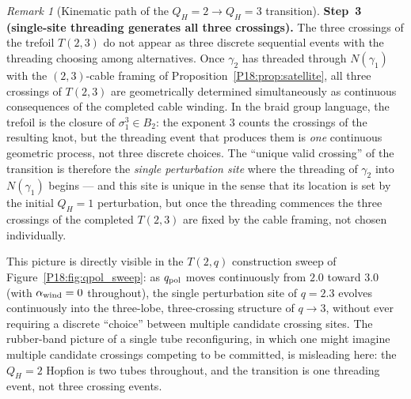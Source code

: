 \documentclass[11pt,a4paper]{article}
\theoremstyle{definition}\newtheorem{definition}[theorem]{Definition}
\theoremstyle{remark}
\newtheorem{remark}[theorem]{Remark}
\newcommand{\QH}{Q_H}
\begin{document}
\begin{remark}[Kinematic path of the $\QH=2\to\QH=3$ transition]
\textbf{Step~3 (single-site threading generates all three crossings).}
The three crossings of the trefoil $T(2,3)$ do not appear as three
discrete sequential events with the threading choosing among
alternatives.  Once $\gamma_2$ has threaded through $N(\gamma_1)$
with the $(2,3)$-cable framing of Proposition~\ref{P18:prop:satellite},
all three crossings of $T(2,3)$ are geometrically determined
simultaneously as continuous consequences of the completed cable
winding.  In the braid group language, the trefoil is the closure
of $\sigma_1^3\in B_2$: the exponent $3$ counts the crossings of the
resulting knot, but the threading event that produces them is
\emph{one} continuous geometric process, not three discrete choices.
The ``unique valid crossing'' of the transition is therefore the
\emph{single perturbation site} where the threading of $\gamma_2$
into $N(\gamma_1)$ begins --- and this site is unique in the sense
that its location is set by the initial $\QH=1$ perturbation, but
once the threading commences the three crossings of the completed
$T(2,3)$ are fixed by the cable framing, not chosen individually.

This picture is directly visible in the $T(2,q)$ construction sweep
of Figure~\ref{P18:fig:qpol_sweep}: as $q_{\rm pol}$ moves continuously
from $2.0$ toward $3.0$ (with $\alpha_{\rm wind}=0$ throughout), the
single perturbation site of $q=2.3$ evolves continuously into the
three-lobe, three-crossing structure of $q\to3$, without ever
requiring a discrete ``choice'' between multiple candidate crossing
sites.  The rubber-band picture of a single tube reconfiguring, in
which one might imagine multiple candidate crossings competing to
be committed, is misleading here: the $\QH=2$ Hopfion is two tubes
throughout, and the transition is one threading event, not three
crossing events.


\end{remark}
\end{document}
